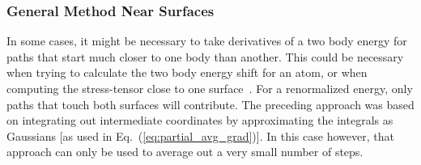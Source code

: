 
\subsubsection{General Method Near Surfaces}
\label{sec:general_path_averaging}

In some cases, it might be necessary to take derivatives of a two body energy for paths that 
start much closer to one body than another.  This could be necessary when trying to calculate the two body energy 
shift for an atom, or when computing the stress-tensor close to one surface~\citep{Schafer2016}. 
For a renormalized energy, only paths that touch both
surfaces will contribute.   The preceding approach was based on integrating out intermediate
coordinates by approximating the integrals as Gaussians [as used in Eq.~(\ref{eq:partial_avg_grad})]. 
In this case however, that approach can only be used to average out a very small number of steps.  

